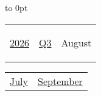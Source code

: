 \vbox to 0pt{}


\pagebreak
{\noindent\Large\renewcommand{\arraystretch}{\myNumArrayStretch}\begin{tabular}{|l|l|l}
\hyperlink{2026}{2026} & \hyperlink{Q3}{Q3} & \hypertarget{August}{August}
\end{tabular}\hfill%
\begin{tabular}{r|r@{}}
\hyperlink{July}{July} & \hyperlink{September}{September}
\end{tabular}}
\myLineThick\medskip

{%

\setlength{\tabcolsep}{\myLenTabColSep}%
%
\begin{tabularx}{\linewidth}{|l!{\vrule width \myLenLineThicknessThick}*{7}{@{}X@{}|}}
  

\end{tabularx}}
